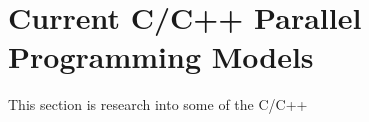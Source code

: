 \section{Current C/C++ Parallel Programming Models}

This section is research into some of the C/C++ 





